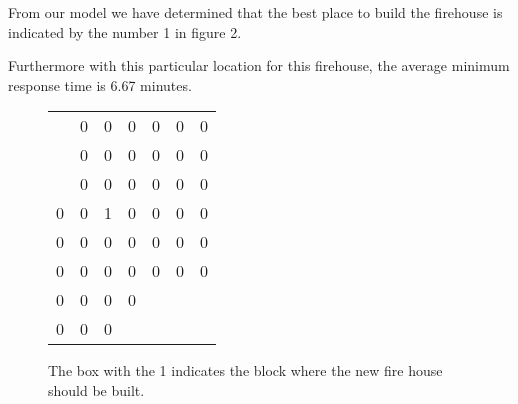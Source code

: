 \documentclass{article}
\begin{document}
From our model we have determined that the best place to build the firehouse is indicated by the number 1 in figure 2.

Furthermore with this particular location for this firehouse, the average minimum response time is 6.67 minutes.

\begin{figure}[h]
\begin{center}
\begin{tabular}{ c c c c c c c } 
 

 \cline{2-7}
 & \multicolumn{1}{|r}{0} & \multicolumn{1}{|r}{0} & \multicolumn{1}{|r}{0} & \multicolumn{1}{|r}{0} & \multicolumn{1}{|r}{0} & \multicolumn{1}{|r|}{0}\\
 \cline{2-7}
 &\multicolumn{1}{|r}{0} & \multicolumn{1}{|r}{0} & \multicolumn{1}{|r}{0} & \multicolumn{1}{|r}{0} & \multicolumn{1}{|r}{0} & \multicolumn{1}{|r|}{0} \\
 \cline{2-7}
 & \multicolumn{1}{|r}{0} & \multicolumn{1}{|r}{0} & \multicolumn{1}{|r}{0} & \multicolumn{1}{|r}{0} & \multicolumn{1}{|r}{0} & \multicolumn{1}{|r|}{0}\\ 
 \hline
 \multicolumn{1}{|r}{0} & \multicolumn{1}{|r}{0} & \multicolumn{1}{|r}{1} & \multicolumn{1}{|r}{0} & \multicolumn{1}{|r}{0} & \multicolumn{1}{|r}{0} & \multicolumn{1}{|r|}{0}\\
 \hline
 \multicolumn{1}{|r}{0} & \multicolumn{1}{|r}{0} & \multicolumn{1}{|r}{0} & \multicolumn{1}{|r}{0} & \multicolumn{1}{|r}{0} & \multicolumn{1}{|r}{0} & \multicolumn{1}{|r|}{0}\\
 \hline
 \multicolumn{1}{|r}{0} & \multicolumn{1}{|r}{0} & \multicolumn{1}{|r}{0} & \multicolumn{1}{|r}{0} & \multicolumn{1}{|r}{0} & \multicolumn{1}{|r}{0} & \multicolumn{1}{|r|}{0}\\
 \hline
 \multicolumn{1}{|r}{0} & \multicolumn{1}{|r}{0} & \multicolumn{1}{|r}{0} & \multicolumn{1}{|r|}{0} &&&\\
 \cline{1-4}
 \multicolumn{1}{|r}{0} & \multicolumn{1}{|r}{0} & \multicolumn{1}{|r|}{0} &&&&\\
 \cline{1-3}
\end{tabular}

\caption{The box with the 1 indicates the block where the new fire house should be built.}
\end{center}
\end{figure}
\end{document}
